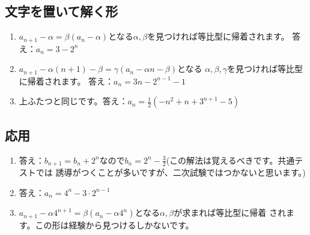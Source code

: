 \documentclass[12pt,a4paper]{jsarticle}
\begin{document}
\subsection{文字を置いて解く形}
\begin{enumerate}
    \item $a_{n+1}-\alpha = \beta (a_n -\alpha)$となる$\alpha,\beta$を見つければ等比型に帰着されます。
    答え：$a_n = 3-2^n$
    \item $a_{n+1}-\alpha (n+1) -\beta= \gamma (a_n -\alpha n -\beta)$となる
    $\alpha,\beta,\gamma$を見つければ等比型に帰着されます。
    答え：$a_n = 3n-2^{n-1}-1$
    \item 上ふたつと同じです。答え：$a_n= \frac{1}{2}(-n^2+n+3^{n+1}-5)$
\end{enumerate}
\subsection{応用}
\begin{enumerate}
    \item 答え：$b_{n+1}=b_n+2^n$なので$b_n=2^n-\frac{3}{2}$(この解法は覚えるべきです。共通テストでは
    誘導がつくことが多いですが、二次試験ではつかないと思います。)
    \item 答え：$a_n= 4^n -3\cdot 2^{n-1}$
    \item $a_{n+1}-\alpha 4^{n+1}=\beta(a_n-\alpha 4^n)$となる$\alpha,\beta$が求まれば等比型に帰着
    されます。この形は経験から見つけるしかないです。
\end{enumerate}
\end{document}

